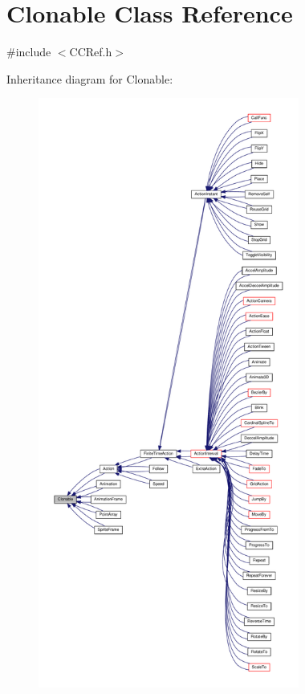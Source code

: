 \hypertarget{classClonable}{}\section{Clonable Class Reference}
\label{classClonable}


{\ttfamily \#include $<$C\+C\+Ref.\+h$>$}



Inheritance diagram for Clonable\+:
\nopagebreak
\begin{figure}[H]
\begin{center}
\leavevmode
\includegraphics[height=550pt]{classClonable__inherit__graph}
\end{center}
\end{figure}
